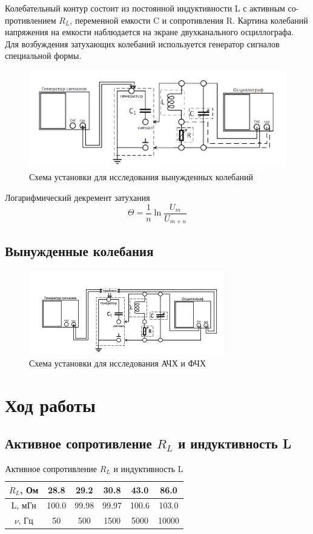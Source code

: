 \documentclass[a4paper,12 pt]{article}
\begin{document}
Колебательный контур состоит из постоянной индуктивности L с активным со-
противлением $R_L$, переменной емкости C и сопротивления R. Картина колебаний
напряжения на емкости наблюдается на экране двухканального осциллографа. Для возбуждения затухающих колебаний используется генератор сигналов специальной
формы.
\begin{figure}[H]
    \centering
    \includegraphics[scale=1]{1.png}
    \caption{Схема установки для исследования вынужденных колебаний}
    \label{fig:enter-label}
\end{figure}

Логарифмический декремент затухания
\begin{equation}
    \Theta=\frac{1}{n} \ln \frac{U_m}{U_{m+n}}    
\end{equation}

\subsection{Вынужденные колебания}

\begin{figure}[H]
    \centering
    \includegraphics[scale=1.5]{2.png}
    \caption{Схема установки для исследования АЧХ и ФЧХ}
\end{figure}



\section{Ход работы}

\subsection{Активное сопротивление $R_L$ и индуктивность L}
\begin{table}[H]
    \centering
    \begin{tabular}{|c|c|c|c|c|c|}
    \hline
        $R_L$, Ом & 28.8 & 29.2 & 30.8 & 43.0 & 86.0 \\
    \hline
        L, мГн & 100.0 & 99.98 & 99.97 & 100.6 & 103.0 \\
    \hline
        $\nu$, Гц & 50 & 500 & 1500 & 5000 & 10000 \\
    \hline
    \end{tabular}
    \caption{Активное сопротивление $R_L$ и индуктивность L}
\end{table}
\end{document}
